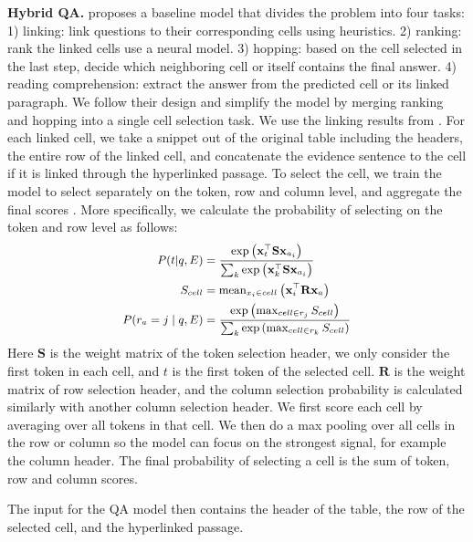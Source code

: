 \documentclass[11pt]{article}
\begin{document}
\noindent\textbf{Hybrid QA.}
\citet{chen-etal-2020-hybridqa} proposes a baseline model that divides the problem into four tasks: 1) linking: link questions to their corresponding cells using heuristics. 2) ranking: rank the linked cells use a neural model. 3) hopping: based on the cell selected in the last step, decide which neighboring cell or itself contains the final answer. 4) reading comprehension: extract the answer from the predicted cell or its linked paragraph. We follow their design and simplify the model by merging ranking and hopping into a single cell selection task. We use the linking results from \citet{chen-etal-2020-hybridqa}. For each linked cell, we take a snippet out of the original table including the headers, the entire row of the linked cell, and concatenate the evidence sentence to the cell if it is linked through the hyperlinked passage. To select the cell, we train the model to select separately on the token, row and column level, and aggregate the final scores . More specifically, we calculate the probability of selecting on the token and row level as follows:
\begin{equation}\small{
\begin{aligned}
    P(t|q, E)&=\frac{\exp \left(\mathbf{x}_{t}^{\top} \mathbf{S} \mathbf{x}_{a_i}\right)}{\sum_{k} \exp \left(\mathbf{x}_{k}^{\top} \mathbf{S} \mathbf{x}_{a_i}\right)} \\
    S_{cell}&=\mathrm{mean}_{x_i \in cell}\left(\mathbf{x}_{i}^{\top} \mathbf{R} \mathbf{x}_{a}\right)\\
    P(r_a=j \mid q, E)&=\frac{\exp \left(\max_{cell \in r_j}S_{cell}\right)}{\sum_{k} \exp \left(\max_{cell \in r_k}S_{cell}\right)}
\end{aligned}
}\end{equation}
Here $\mathbf{S}$ is the weight matrix of the token selection header, we only consider the first token in each cell, and $t$ is the first token of the selected cell. $\mathbf{R}$ is the weight matrix of row selection header, and the column selection probability is calculated similarly with another column selection header. We first score each cell by averaging over all tokens in that cell. We then do a max pooling over all cells in the row or column so the model can focus on the strongest signal, for example the column header. The final probability of selecting a cell is the sum of token, row and column scores.

The input for the QA model then contains the header of the table, the row of the selected cell, and the hyperlinked passage.
\end{document}
